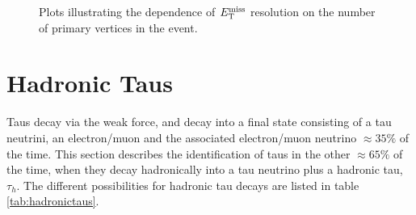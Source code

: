\begin{figure}
\begin{center}
\end{center}
\caption{Plots illustrating the dependence of $E_{\mathrm{T}}^{\text{miss}}$ resolution on the number of
primary vertices in the event.
}
\label{fig:mvamet}
\end{figure}

\section{Hadronic Taus}
\label{sec:taus}

Taus decay via the weak force, and decay into a final state consisting of a tau
neutrini, an electron/muon and the associated electron/muon neutrino $\approx35\%$ of
the time. This section describes the identification of taus in the other $\approx65\%$ of the time,
when they decay hadronically into a tau neutrino plus a hadronic tau, $\tau_{h}$. The different
possibilities for hadronic tau decays are listed in table \ref{tab:hadronictaus}.

